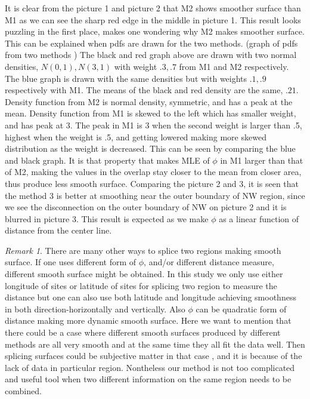 \documentclass[10pt]{article}
\theoremstyle{plain}
\theoremstyle{definition}
\theoremstyle{remark}
\newtheorem*{rem}{Remark}
\begin{document}
\justify
It is clear from the picture 1 and picture 2 that M2 shows smoother surface than M1 as we can see the sharp red edge in the middle in picture 1.
This result looks puzzling in the first place, makes one wondering why M2 makes smoother surface. This can be explained  when pdfs are drawn for the two methods.
(graph of pdfs from two methods )
\justify
The black and red graph above are drawn with two normal densities, $N(0,1), N(3,1)$ with weight $.3, .7 $ from M1 and M2 respectively. The blue graph is drawn with the same densities but with weights $.1,.9$ respectively with M1. 
The means of the black and red density are the same, $.21.$
Density function from M2 is normal density, symmetric, and has a peak at the mean. 
Density function from M1 is skewed to the left which has smaller weight, and has peak at 3.  The peak in M1 is 3 when the second weight is larger than .5, highest when the weight is .5, and  getting lowered making more skewed distribution as 
the weight is decreased. This can be seen by comparing the blue and black graph. 
It is that property that makes MLE of $\phi$ in M1 larger than that of M2, making the values in the overlap stay closer to the mean from closer area,
thus produce less smooth surface.
\justify
Comparing the picture 2 and 3, it is seen that the method 3 is better at smoothing near the outer boundary of NW region,
since we see the disconnection on the outer boundary  of NW on picture 2 and it is blurred in picture 3. This result is 
expected as we make $\phi$ as a linear function of distance from the center line. 


\begin{rem}
	There are many other ways to splice two regions making smooth surface. If one uses different form of $\phi$, and/or different distance
	measure, different smooth surface might be obtained. In this study we only use either longitude of sites or latitude of sites  for splicing two region to measure the distance but one can also use both latitude and longitude achieving smoothness in both direction-horizontally and vertically.
	Also  $\phi$ can be  quadratic form of distance making more dynamic smooth surface.
	Here we want to mention that there could be a case where different smooth surfaces produced by different methods are all very smooth and at the same time they all fit the data well. Then splicing surfaces could be subjective matter in that case , and it is because of the lack of data in particular region. 
	Nontheless our method is not too complicated and useful tool when two different information on the same region needs to be combined.
	
\end{rem}
\end{document}
